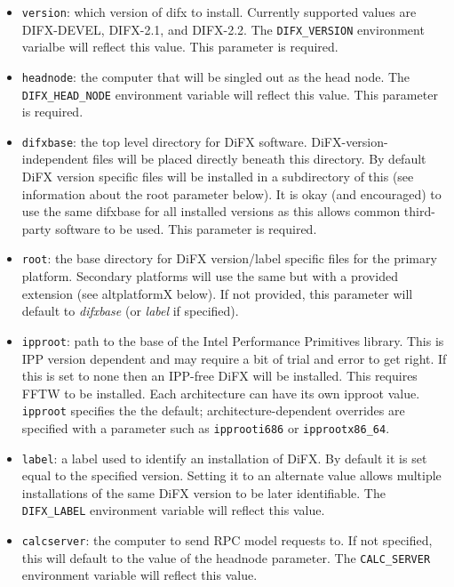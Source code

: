 \begin{itemize}
\item {\tt version}: which version of difx to install.
Currently supported values are DIFX-DEVEL, DIFX-2.1, and DIFX-2.2.
The {\tt DIFX\_VERSION} environment varialbe will reflect this value.
This parameter is required.

\item {\tt headnode}: the computer that will be singled out as the head node.
The {\tt DIFX\_HEAD\_NODE} environment variable will reflect this value.
This parameter is required.

\item {\tt difxbase}: the top level directory for DiFX software.
DiFX-version-independent files will be placed directly beneath this directory.
By default DiFX version specific files will be installed in a subdirectory of this (see information about the root parameter below).
It is okay (and encouraged) to use the same difxbase for all installed versions as this allows common third-party software to be used.
This parameter is required.

\item {\tt root}: the base directory for DiFX version/label specific files for the primary platform.
Secondary platforms will use the same but with a provided extension (see altplatformX below).
If not provided, this parameter will default to {\em difxbase} (or {\em label} if specified).

\item {\tt ipproot}: path to the base of the Intel Performance Primitives library.
This is IPP version dependent and may require a bit of trial and error to get right.
If this is set to  none  then an IPP-free DiFX will be installed.
This requires FFTW to be installed.
Each architecture can have its own ipproot value.
{\tt ipproot} specifies the the default; architecture-dependent overrides are specified with a parameter such as {\tt ipprooti686} or {\tt ipprootx86\_64}.

\item {\tt label}: a label used to identify an installation of DiFX.
By default it is set equal to the specified version.
Setting it to an alternate value allows multiple installations of the same DiFX version to be later identifiable.
The {\tt DIFX\_LABEL} environment variable will reflect this value.

\item {\tt calcserver}: the computer to send RPC model requests to.
If not specified, this will default to the value of the headnode parameter.
The {\tt CALC\_SERVER} environment variable will reflect this value.


\end{itemize}
